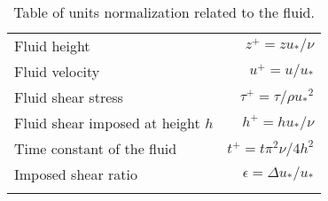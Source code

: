\begin{table}
    \centering
    \begin{tabular}{l r}
        \hline
        Fluid height & $z^+ = zu_*/\nu$ \\
        Fluid velocity & $u^+ = u/u_*$ \\
        Fluid shear stress & $\tau^+ = \tau/\rho {u_*}^2$ \\
        Fluid shear imposed at height $h$ & $h^+ = hu_*/\nu$ \\
        Time constant of the fluid & $t^+ = t\pi^2\nu/4h^2$ \\
        Imposed shear ratio & $\epsilon = \Delta u_*/u_*$ \\
        \hline \hline
        \label{tab:units}
    \end{tabular}
    \caption{Table of units normalization related to the fluid.}
\end{table}
